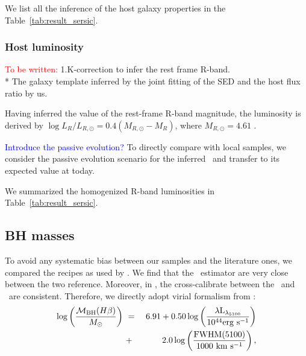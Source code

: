 \documentclass[apj]{emulateapj}
\begin{document}
We list all the inference of the host galaxy properties in the Table~\ref{tab:result_sersic}.

\subsubsection{Host luminosity}
\textcolor{red}{To be written:}
1.K-correction to infer the rest frame R-band.\\
* The galaxy template inferred by the joint fitting of the SED and the host flux ratio by us.

Having inferred the value of the rest-frame R-band magnitude, the luminosity is derived by $\log L_R/L_{R, \odot} = 0.4 (M_{R, \odot}-M_R)$, where $M_{R, \odot}=4.61$ \citep{Blanton07}.

\textcolor{blue}{Introduce the passive evolution?}
To directly compare with local samples, we consider the passive evolution scenario for the inferred \lhost\ and transfer to its expected value at today.

We summarized the homogenized R-band luminosities
in Table~\ref{tab:result_sersic}.

\subsection{BH masses}
\label{mbh}
To avoid any systematic bias between our samples and the literature ones, we compared the recipes as used by \citet{Schulze2018, Ding2017b}. We find that the \hbeta\ estimator are very close between the two reference. Moreover, in \citet{Schulze2018}, the cross-calibrate between the \halpha\ and \hbeta\ are consistent. Therefore, we directly adopt virial formalism from \citet{Schulze2018}:
\begin{eqnarray}
\label{eq:Hb}
\log \left(\frac{\mathcal M_{\rm BH}(H\beta) }{M_{\odot}}\right)&~=~& 6.91+0.50\log \left(\frac{ \lambda \rm L _{\lambda_{5100}}}{10^{44}{\rm erg~s^{-1}}}\right) \nonumber\\
&~+~& 2.0 \log \left(\frac{\rm FWHM(5100)}{1000 ~{\rm km~s^{-1}}}\right) , 
\end {eqnarray}
\end{document}
